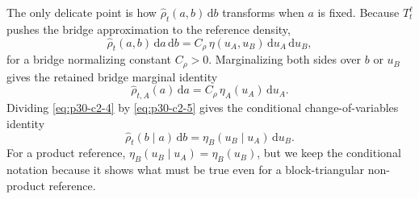 \documentclass[11pt]{article}
\numberwithin{equation}{section}
\newcommand{\dd}{\,\mathrm d}
\begin{document}
The only delicate point is how \(\widehat\rho_t(a,b)\dd b\) transforms when
\(a\) is fixed.  Because \(T_t^\ell\) pushes the bridge approximation to the
reference density,
\begin{equation}
    \widehat\rho_t(a,b)\dd a\dd b
    =
    C_\rho\,\eta(u_A,u_B)\dd u_A\dd u_B,
    \label{eq:p30-c2-4}
\end{equation}
for a bridge normalizing constant \(C_\rho>0\).  Marginalizing both sides over
\(b\) or \(u_B\) gives the retained bridge marginal identity
\begin{equation}
    \widehat\rho_{t,A}(a)\dd a
    =
    C_\rho\,\eta_A(u_A)\dd u_A.
    \label{eq:p30-c2-5}
\end{equation}
Dividing \eqref{eq:p30-c2-4} by \eqref{eq:p30-c2-5} gives the conditional
change-of-variables identity
\begin{equation}
    \widehat\rho_t(b\mid a)\dd b
    =
    \eta_B(u_B\mid u_A)\dd u_B.
    \label{eq:p30-c2-6}
\end{equation}
For a product reference, \(\eta_B(u_B\mid u_A)=\eta_B(u_B)\), but we keep the
conditional notation because it shows what must be true even for a
block-triangular non-product reference.
\end{document}

